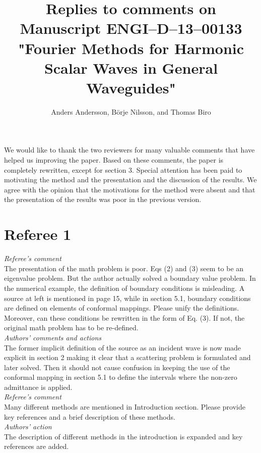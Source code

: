 \documentclass[a4paper,12pt]{article}%
\begin{document}
\date{}
\title{Replies to comments on\\Manuscript ENGI--D--13--00133\\"Fourier Methods for Harmonic Scalar Waves in General
    Waveguides"}
\author{Anders Andersson, B\"orje Nilsson, and Thomas Biro}
\maketitle

We would like to thank the two reviewers for many valuable comments that have helped us improving the paper. Based on these comments, the paper is completely rewritten, except for section 3. Special attention has been paid to motivating the method and the presentation and the discussion of the results. We agree with the opinion that the motivations for the method were absent and that the presentation of the results was poor in the previous version.
\section*{Referee 1}


{\it Referee's comment}\\
The presentation of the math problem is poor. Eqs (2) and (3) seem to be an eigenvalue problem. But the author actually solved a boundary value problem. In the numerical example, the definition of boundary conditions is misleading. A source at left is mentioned in page 15, while in section 5.1, boundary conditions are defined on elements of conformal mappings. Please unify the definitions. Moreover, can these conditions be rewritten in the form of Eq. (3). If not, the original math problem has to be re-defined.\\
{\it Authors' comments and actions}\\
The former implicit definition of the source as an incident wave is now made explicit in section 2 making it clear that a scattering problem is formulated and later solved. Then it should not cause confusion in keeping the use of the conformal mapping in section 5.1 to define the intervals where the non-zero admittance is applied.\\
\newline
{\it Referee's comment}\\
Many different methods are mentioned in Introduction section. Please provide key references and a brief description of these methods.\\
{\it Authors' action}\\
The description of different methods in the introduction is expanded and key references are added.
\end{document}
